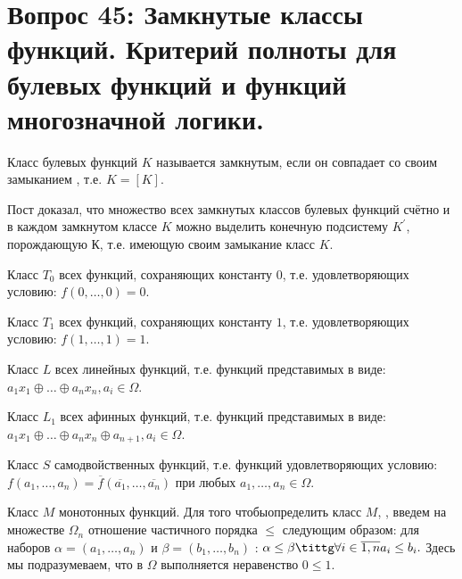 \section{Вопрос 45: Замкнутые классы функций. Критерий полноты для булевых функций и функций многозначной логики.}

\begin{defs}
Класс булевых функций $K$ называется замкнутым, если он совпадает со своим замыканием , т.е. $K=[K]$.
\end{defs}

 Пост доказал, что множество всех замкнутых классов булевых функций счётно и в каждом замкнутом классе $K$ можно выделить конечную подсистему $K^{'}$, порождающую $К$, т.е. имеющую своим замыкание класс $K$.

 Класс $T_{0}$ всех функций, сохраняющих константу $0$, т.е. удовлетворяющих условию: $f(0,\ldots,0)=0$.

 Класс $T_{1}$ всех функций, сохраняющих константу $1$, т.е. удовлетворяющих условию: $f(1,\ldots,1)=1$.

 Класс $L$ всех линейных функций, т.е. функций представимых в  виде: $a_{1} x_{1} \oplus \ldots \oplus a_{n} x_{n}, a_{i} \in \Omega  $.

 Класс $L_{1}$ всех афинных функций, т.е. функций представимых в  виде: $a_{1} x_{1} \oplus \ldots \oplus a_{n} x_{n} \oplus a_{n+1}, a_{i} \in \Omega  $.

 Класс $S$ самодвойственных функций, т.е. функций удовлетворяющих условию: $f(a_{1}, \ldots, a_{n}) = \overline{f}(\overline{a_{1}}, \ldots, \overline{a_{n}})$ при любых $a_{1}, \ldots, a_{n} \in \Omega$.

 Класс $M$ монотонных функций.
Для того чтобыопределить класс $M$, , введем на множестве $\Omega_{n}$ отношение частичного порядка $\leq$ следующим образом: для наборов $\alpha = (a_{1}, \ldots, a_{n})$ и $\beta= (b_{1}, \ldots, b_{n})$ : $\alpha \leq \beta \tittg \forall i \in \overline{1,n}   a_{i} \leq b_{i}.$      Здесь мы подразумеваем, что в $\Omega$ выполняется неравенство $0 \leq 1$.



